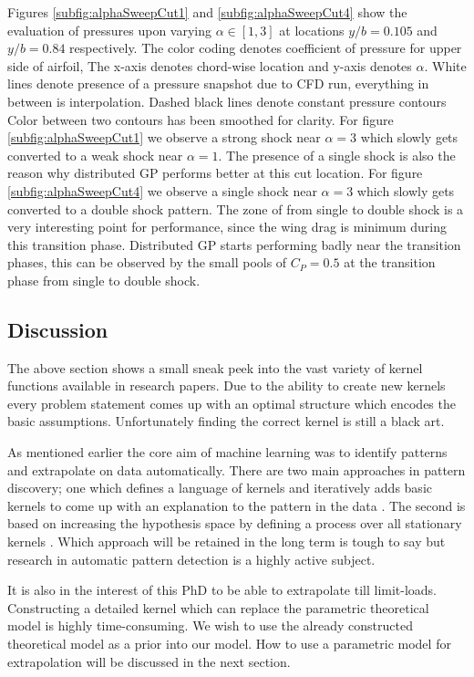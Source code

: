 Figures \ref{subfig:alphaSweepCut1} and \ref{subfig:alphaSweepCut4} show the evaluation of pressures upon varying \(\alpha \in [1, 3]\) at locations \(y/b = 0.105\) and \(y/b = 0.84\) respectively. The color coding denotes coefficient of pressure for upper side of airfoil, The x-axis denotes chord-wise location and y-axis denotes \(\alpha\). White lines denote presence of a pressure snapshot due to CFD run, everything in between is interpolation. Dashed black lines denote constant pressure contours Color between two contours has been smoothed for clarity. For figure \ref{subfig:alphaSweepCut1} we observe a strong shock near \(\alpha = 3\) which slowly gets converted to a weak shock near \(\alpha = 1\). The presence of a single shock is also the reason why distributed GP performs better at this cut location. For figure \ref{subfig:alphaSweepCut4} we observe a single shock near \(\alpha = 3\) which slowly gets converted to a double shock pattern. The zone of from single to double shock is a very interesting point for performance, since the wing drag is minimum during this transition phase. Distributed GP starts performing badly near the transition phases, this can be observed by the small pools of \(C_{P} = 0.5\) at the transition phase from single to double shock. 


\subsection{Discussion}\label{subsec:ExpressingStructureKernelConclusion}
The above section shows a small sneak peek into the vast variety of kernel functions available in research papers. Due to the ability to create new kernels every problem statement comes up with an optimal structure which encodes the basic assumptions. Unfortunately finding the correct kernel is still a black art. 
 
As mentioned earlier the core aim of machine learning was to identify patterns and extrapolate on data automatically. There are two main approaches in pattern discovery; one which defines a language of kernels and iteratively adds basic kernels to come up with an explanation to the pattern in the data \cite{lloyd2014automatic}. The second is based on increasing the hypothesis space by defining a process over all stationary kernels \cite{wilson2012process}. Which approach will be retained in the long term is tough to say but research in automatic pattern detection is a highly active subject. 

It is also in the interest of this PhD to be able to extrapolate till limit-loads. Constructing a detailed kernel which can replace the parametric theoretical model is highly time-consuming. We wish to use the already constructed theoretical model as a prior into our model. How to use a parametric model for extrapolation will be discussed in the next section.

